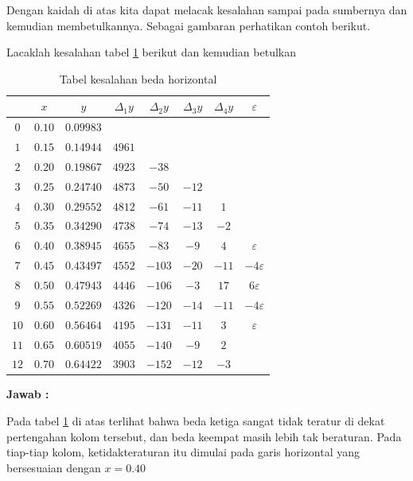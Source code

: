 Dengan kaidah di atas kita dapat melacak kesalahan sampai pada sumbernya dan kemudian membetulkannya. Sebagai gambaran perhatikan contoh berikut.

\begin{exmp}\end{exmp}
Lacaklah kesalahan tabel \ref{tabel:ContohSoalKesalahanBedaHorizon} berikut dan kemudian betulkan

\begin{table}[!htbp]
\centering
\caption{Tabel kesalahan beda horizontal}
\label{tabel:ContohSoalKesalahanBedaHorizon}
\begin{tabular}{@{}|c|c|c|c|c|c|c|c|@{}}
\hline
 & $x$ & $y$ & $\Delta_1 y$ & $\Delta_2 y$ & $\Delta_3 y$ & $\Delta_4 y$ & $\varepsilon$ \\[0.3ex]
\hline
$0$ & $0.10$ & $0.09983$ & & & & & \\[0.3ex]
$1$ & $0.15$ & $0.14944$ & $4961$ & & & & \\[0.3ex]
$2$ & $0.20$ & $0.19867$ & $4923$ & $-38$ & & & \\[0.3ex]
$3$ & $0.25$ & $0.24740$ & $4873$ & $-50$ & $-12$ & & \\[0.3ex]
$4$ & $0.30$ & $0.29552$ & $4812$ & $-61$ & $-11$ & $1$ & \\[0.3ex]
$5$ & $0.35$ & $0.34290$ & $4738$ & $-74$ & $-13$ & $-2$ & \\[0.3ex]
$6$ & $0.40$ & $0.38945$ & $4655$ & $-83$ & $-9$ & $4$ & $\varepsilon$\\[0.3ex]
$7$ & $0.45$ & $0.43497$ & $4552$ & $-103$ & $-20$ & $-11$ & $-4\varepsilon$\\[0.3ex]
$8$ & $0.50$ & $0.47943$ & $4446$ & $-106$ & $-3$ & $17$ & $6\varepsilon$\\[0.3ex]
$9$ & $0.55$ & $0.52269$ & $4326$ & $-120$ & $-14$ & $-11$ & $-4\varepsilon$\\[0.3ex]
$10$ & $0.60$ & $0.56464$ & $4195$ & $-131$ & $-11$ & $3$ & $\varepsilon$\\[0.3ex]
$11$ & $0.65$ & $0.60519$ & $4055$ & $-140$ & $-9$ & $2$ & \\[0.3ex]
$12$ & $0.70$ & $0.64422$ & $3903$ & $-152$ & $-12$ & $-3$ & \\[0.3ex]
\hline
\end{tabular}
\end{table}

{\bf Jawab :}

Pada tabel \ref{tabel:ContohSoalKesalahanBedaHorizon} di atas terlihat bahwa beda ketiga sangat tidak teratur di dekat pertengahan kolom tersebut, dan beda keempat masih lebih tak beraturan. Pada tiap-tiap kolom, ketidakteraturan itu dimulai pada garis horizontal yang bersesuaian dengan $x=0.40$

